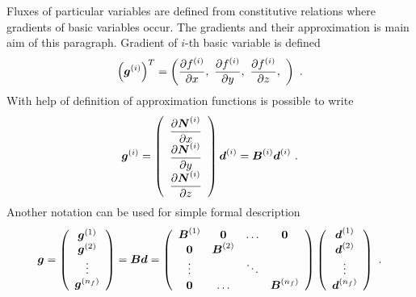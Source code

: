 \documentclass[12pt]{book}
\newcommand{\mbf}[1]{\mbox{\boldmath$#1$}}
\newcommand{\del}[2]{\mbox{$\displaystyle\frac{#1}{#2}$}}
\newcommand{\ppd}[2]{\del{\partial{#1}}{\partial{#2}}}
\begin{document}
Fluxes of particular variables are defined from constitutive relations where gradients of basic variables occur.
The gradients and their approximation is main aim of this paragraph. Gradient of $i$-th basic variable is defined
\begin{equation}
\left(\mbf{g}^{(i)}\right)^T = \left(\ppd{f^{(i)}}{x},\ \ppd{f^{(i)}}{y},\ \ppd{f^{(i)}}{z},\ \right)\ .
\end{equation}
With help of definition of approximation functions is possible to write
\begin{equation}
\mbf{g}^{(i)} =
\left(\begin{array}{c}
\ppd{\mbf{N}^{(i)}}{x}
\\
\ppd{\mbf{N}^{(i)}}{y}
\\
\ppd{\mbf{N}^{(i)}}{z}
\end{array}\right)\mbf{d}^{(i)}
= \mbf{B}^{(i)} \mbf{d}^{(i)}\ .
\end{equation}
Another notation can be used for simple formal description
\begin{equation}\label{defgradmat}
\mbf{g} = \left(\begin{array}{c}
\mbf{g}^{(1)}
\\
\mbf{g}^{(2)}
\\
\vdots
\\
\mbf{g}^{(n_f)}
\end{array}\right)
= \mbf{B} \mbf{d} =
\left(\begin{array}{cccc}
\mbf{B}^{(1)} & \mbf{0}       & \ldots & \mbf{0}
\\
\mbf{0}       & \mbf{B}^{(2)} &        &
\\
\vdots        &               & \ddots &
\\
\mbf{0}       & \ldots        &        & \mbf{B}^{(n_f)}
\\
\end{array}\right)
\left(\begin{array}{c}
\mbf{d}^{(1)}
\\
\mbf{d}^{(2)}
\\
\vdots
\\
\mbf{d}^{(n_f)}
\end{array}\right)\ .
\end{equation}
\end{document}
